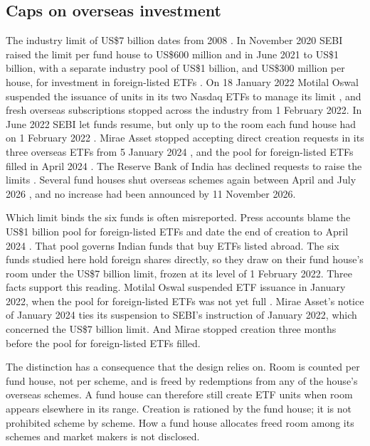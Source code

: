 \documentclass[11pt,a4paper]{article}
\theoremstyle{definition}
\begin{document}
\subsection{Caps on overseas investment}
The industry limit of US\$7 billion dates from 2008 \citep{lawasia2026}. In November 2020 SEBI raised the limit per fund house to US\$600 million \citep{bs2020limit} and in June 2021 to US\$1 billion, with a separate industry pool of US\$1 billion, and US\$300 million per house, for investment in foreign-listed ETFs \citep{bs2021limit}. On 18 January 2022 Motilal Oswal suspended the issuance of units in its two Nasdaq ETFs to manage its limit \citep{bs2022motilal}, and fresh overseas subscriptions stopped across the industry from 1 February 2022. In June 2022 SEBI let funds resume, but only up to the room each fund house had on 1 February 2022 \citep{pti2022resume}. Mirae Asset stopped accepting direct creation requests in its three overseas ETFs from 5 January 2024 \citep{mirae2024addendum}, and the pool for foreign-listed ETFs filled in April 2024 \citep{zerodha2024etf}. The Reserve Bank of India has declined requests to raise the limits \citep{bs2023rbi}. Several fund houses shut overseas schemes again between April and July 2026 \citep{outlook2026menu}, and no increase had been announced by 11 November 2026.

Which limit binds the six funds is often misreported. Press accounts blame the US\$1 billion pool for foreign-listed ETFs and date the end of creation to April 2024 \citep[for example][]{vr2026up41}. That pool governs Indian funds that buy ETFs listed abroad. The six funds studied here hold foreign shares directly, so they draw on their fund house's room under the US\$7 billion limit, frozen at its level of 1 February 2022. Three facts support this reading. Motilal Oswal suspended ETF issuance in January 2022, when the pool for foreign-listed ETFs was not yet full \citep{bs2022bind}. Mirae Asset's notice of January 2024 ties its suspension to SEBI's instruction of January 2022, which concerned the US\$7 billion limit. And Mirae stopped creation three months before the pool for foreign-listed ETFs filled.

The distinction has a consequence that the design relies on. Room is counted per fund house, not per scheme, and is freed by redemptions from any of the house's overseas schemes. A fund house can therefore still create ETF units when room appears elsewhere in its range. Creation is rationed by the fund house; it is not prohibited scheme by scheme. How a fund house allocates freed room among its schemes and market makers is not disclosed.
\end{document}
